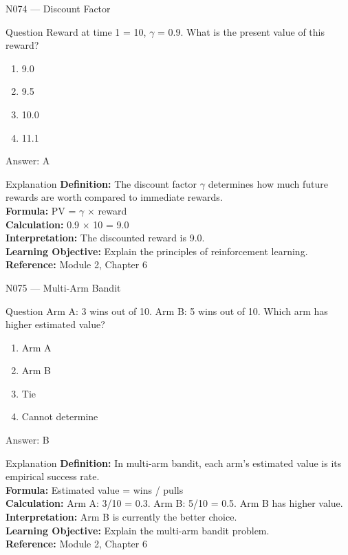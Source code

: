 \documentclass[aspectratio=169,8pt]{beamer}
\begin{document}
	\begin{frame}{N074 --- Discount Factor}
		\begin{block}{Question}
			Reward at time 1 = 10, $\gamma$ = 0.9. What is the present value of this reward?
			\begin{enumerate}
				\item 9.0
				\item 9.5
				\item 10.0
				\item 11.1
			\end{enumerate}
		\end{block}
		\begin{exampleblock}{Answer: A}\end{exampleblock}
		\begin{block}{Explanation}
			\textbf{Definition:} The discount factor $\gamma$ determines how much future rewards are worth compared to immediate rewards.\\
			\textbf{Formula:} PV = $\gamma$ $\times$ reward\\
			\textbf{Calculation:} 0.9 $\times$ 10 = 9.0\\
			\textbf{Interpretation:} The discounted reward is 9.0.\\
			\textbf{Learning Objective:} Explain the principles of reinforcement learning.\\
			\textbf{Reference:} Module 2, Chapter 6
		\end{block}
	\end{frame}
	
	\begin{frame}{N075 --- Multi-Arm Bandit}
		\begin{block}{Question}
			Arm A: 3 wins out of 10. Arm B: 5 wins out of 10. Which arm has higher estimated value?
			\begin{enumerate}
				\item Arm A
				\item Arm B
				\item Tie
				\item Cannot determine
			\end{enumerate}
		\end{block}
		\begin{exampleblock}{Answer: B}\end{exampleblock}
		\begin{block}{Explanation}
			\textbf{Definition:} In multi-arm bandit, each arm's estimated value is its empirical success rate.\\
			\textbf{Formula:} Estimated value = wins / pulls\\
			\textbf{Calculation:} Arm A: 3/10 = 0.3. Arm B: 5/10 = 0.5. Arm B has higher value.\\
			\textbf{Interpretation:} Arm B is currently the better choice.\\
			\textbf{Learning Objective:} Explain the multi-arm bandit problem.\\
			\textbf{Reference:} Module 2, Chapter 6
		\end{block}
	\end{frame}
	
\end{document}
